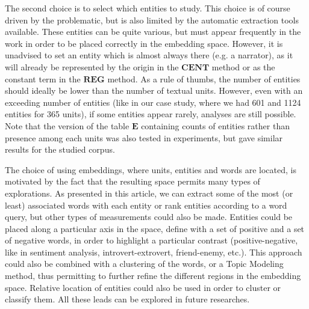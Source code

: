 \documentclass[
twocolumn,
]{ceurart}
\begin{document}
The second choice is to select which entities to study. This choice is of course driven by the problematic, but is also limited by the automatic extraction tools available. These entities can be quite various, but must appear frequently in the work in order to be placed correctly in the embedding space. However, it is unadvised to set an entity which is almost always there (e.g. a narrator), as it will already be represented by the origin in the $\mathbf{CENT}$ method or as the constant term in the $\mathbf{REG}$ method. As a rule of thumbs, the number of entities should ideally be lower than the number of textual units. However, even with an exceeding number of entities (like in our case study, where we had 601 and 1124 entities for 365 units), if some entities appear rarely, analyses are still possible. Note that the version of the table $\mathbf{E}$ containing counts of entities rather than presence among each units was also tested in experiments, but gave similar results for the studied corpus.

The choice of using embeddings, where units, entities and words are located, is motivated by the fact that the resulting space permits many types of explorations. As presented in this article, we can extract some of the most (or least) associated words with each entity or rank entities according to a word query, but other types of measurements could also be made. Entities could be placed along a particular axis in the space, define with a set of positive and a set of negative words, in order to highlight a particular contrast (positive-negative, like in sentiment analysis, introvert-extrovert, friend-enemy, etc.). This approach could also be combined with a clustering of the words, or a Topic Modeling method, thus permitting to further refine the different regions in the embedding space. Relative location of entities could also be used in order to cluster or classify them. All these leads can be explored in future researches.
\end{document}
